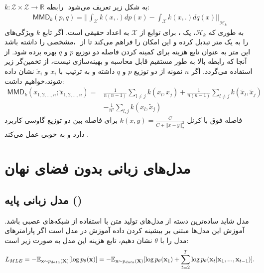 $k: ‎\mathcal{Z} ‎‎\times \mathcal{Z} ‎\rightarrow ‎\mathbb{R}‎‎$
رابطه ‎\mmd{} به شکل زیر تعریف می‌شود:
\begin{gather}
	\mathsf{MMD}_k(p, q) = {\vert \vert \int_\mathcal{X} k(x, .) dp(x) - \int_\mathcal{X} k(x, .) dq(x) \vert \vert}_{\mathcal{H}_k}
\end{gather}
به طوری که $‎\mathcal{H}‎_k$، یک 
،
برای توابع از $‎\mathcal{X}‎$ به اعداد حقیقی است. اگر تابع $k$ ویژگی‌های مشخصی را داشته باشد، ‎\mmd{}‎ را به یک متر تبدیل کرده و این امکان را فراهم می‌کند تا از این متر به عنوان تابع هزینه برای کمینه کردن فاصله دو توزیع $p$  و $q$  بهره برده شود. از آنجا که رابطه بالا به طور مستقیم قابل محاسبه و بهینه‌سازی نیست، از تخمین‌گر 
 زیر استفاده می‌گردد. اگر $n$ نمونه از دو توزیع $p$ و $q$ داشته و به ترتیب با $x_i$ و $‎\tilde{x}_i$ نشان داده شوند،‌خواهیم داشت:
\begin{align}
	\mathsf{MMD}_k(x_{1,2,...,n};\tilde{x}_{1,2,...,n}) = & \frac{1}{n(n-1)} \sum_{l \neq j} k(x_l, x_j) +
	\frac{1}{n(n-1)} \sum_{l \neq j} k(\tilde{x}_l, \tilde{x}_j)                            \nonumber         \\
	                                                      & - \frac{1}{n ^ 2} \sum_{l, j} k(x_l, \tilde{x}_j)
\end{align}
فاصله فوق با کرنل
$k(x, y) = \frac{C}{C + ||x - y||^2_2}$
برای فاصله بین دو توزیع گاوسی کاربرد دارد و به خوبی عمل می‌کند \cite{wae}.

\section{مدل‌های زبانی بدون فضای نهان}
\subsection{مدل زبانی پایه (\teacherforcing{})}
مدل \teacherforcing{} شاید ساده‌ترین دسته از مدل‌های تولید متن با استفاده از شبکه‌های عصبی باشد. آموزش این مدل‌ها مبتنی بر بیشینه کردن \likelihood{} داده آموزش در مدل است \cite{teacher_force} اگر پارامترهای مدل را با $‎\theta$ نشان دهیم، تابع هزینه این مدل به صورت زیر است:
\begin{equation}\begin{split}
		L_{MLE} = -\mathbb E_{{\bf x} \sim p_{data}({\bf X})} [\log p_\theta ({\bf x})] = -\mathbb E_{{\bf x} \sim p_{data}({\bf X})} [\log p_\theta ({\bf x}_1) + \sum_{t=2}^{T}  \log p_\theta ({\bf x}_t|{\bf x}_1, ..., {\bf x}_{t-1})].
	\end{split}\end{equation}

